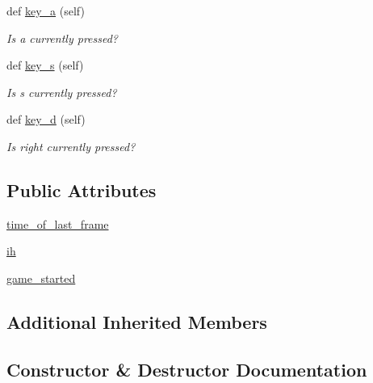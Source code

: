 \begin{DoxyCompactItemize}
def \hyperlink{classbridges_1_1non__blocking__game_1_1_non_blocking_game_a7076d0ff62aeba49a0caf71e213361db}{key\+\_\+a} (self)
\begin{DoxyCompactList}\small\item\em Is a currently pressed? \end{DoxyCompactList}\item 
def \hyperlink{classbridges_1_1non__blocking__game_1_1_non_blocking_game_a2c587b12c3a8bc2b2e96bd2d09ceed1d}{key\+\_\+s} (self)
\begin{DoxyCompactList}\small\item\em Is s currently pressed? \end{DoxyCompactList}\item 
def \hyperlink{classbridges_1_1non__blocking__game_1_1_non_blocking_game_a0c90fcb365dcdb7ccf49b98b3e63ecc8}{key\+\_\+d} (self)
\begin{DoxyCompactList}\small\item\em Is right currently pressed? \end{DoxyCompactList}\end{DoxyCompactItemize}
\subsection*{Public Attributes}
\begin{DoxyCompactItemize}
\item 
\hyperlink{classbridges_1_1non__blocking__game_1_1_non_blocking_game_a828f1abe5336e15ffc718411378da266}{time\+\_\+of\+\_\+last\+\_\+frame}
\item 
\hyperlink{classbridges_1_1non__blocking__game_1_1_non_blocking_game_a5fd9d6e53b58f6237372dfaad03db961}{ih}
\item 
\hyperlink{classbridges_1_1non__blocking__game_1_1_non_blocking_game_a9fdc4b04a7898b739ed05554d64560c7}{game\+\_\+started}
\end{DoxyCompactItemize}
\subsection*{Additional Inherited Members}


\subsection{Constructor \& Destructor Documentation}
\mbox{\label{classbridges_1_1non__blocking__game_1_1_non_blocking_game_aded027939d7461e5b8e04a1cd5554a66}} 
